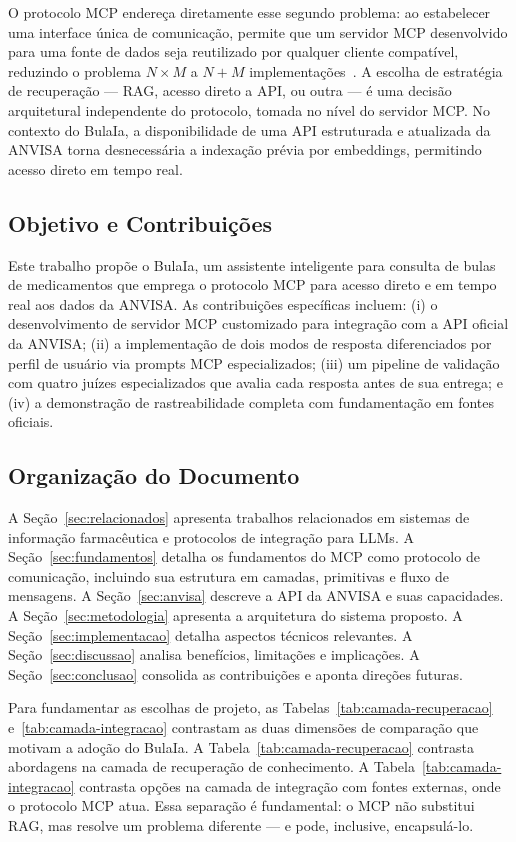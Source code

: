\documentclass[12pt]{article}
\begin{document}
O protocolo MCP endereça diretamente esse segundo problema: ao estabelecer uma interface única de comunicação, permite que um servidor MCP desenvolvido para uma fonte de dados seja reutilizado por qualquer cliente compatível, reduzindo o problema $N \times M$ a $N + M$ implementações~\cite{hou2025mcp}. A escolha de estratégia de recuperação --- RAG, acesso direto a API, ou outra --- é uma decisão arquitetural independente do protocolo, tomada no nível do servidor MCP. No contexto do BulaIa, a disponibilidade de uma API estruturada e atualizada da ANVISA torna desnecessária a indexação prévia por embeddings, permitindo acesso direto em tempo real.

\subsection{Objetivo e Contribuições}

Este trabalho propõe o BulaIa, um assistente inteligente para consulta de bulas de medicamentos que emprega o protocolo MCP para acesso direto e em tempo real aos dados da ANVISA. As contribuições específicas incluem: (i) o desenvolvimento de servidor MCP customizado para integração com a API oficial da ANVISA; (ii) a implementação de dois modos de resposta diferenciados por perfil de usuário via prompts MCP especializados; (iii) um pipeline de validação com quatro juízes especializados que avalia cada resposta antes de sua entrega; e (iv) a demonstração de rastreabilidade completa com fundamentação em fontes oficiais.

\subsection{Organização do Documento}

A Seção~\ref{sec:relacionados} apresenta trabalhos relacionados em sistemas de informação farmacêutica e protocolos de integração para LLMs. A Seção~\ref{sec:fundamentos} detalha os fundamentos do MCP como protocolo de comunicação, incluindo sua estrutura em camadas, primitivas e fluxo de mensagens. A Seção~\ref{sec:anvisa} descreve a API da ANVISA e suas capacidades. A Seção~\ref{sec:metodologia} apresenta a arquitetura do sistema proposto. A Seção~\ref{sec:implementacao} detalha aspectos técnicos relevantes. A Seção~\ref{sec:discussao} analisa benefícios, limitações e implicações. A Seção~\ref{sec:conclusao} consolida as contribuições e aponta direções futuras.

Para fundamentar as escolhas de projeto, as Tabelas~\ref{tab:camada-recuperacao} e~\ref{tab:camada-integracao} contrastam as duas dimensões de comparação que motivam a adoção do BulaIa. A Tabela~\ref{tab:camada-recuperacao} contrasta abordagens na camada de recuperação de conhecimento. A Tabela~\ref{tab:camada-integracao} contrasta opções na camada de integração com fontes externas, onde o protocolo MCP atua. Essa separação é fundamental: o MCP não substitui RAG, mas resolve um problema diferente --- e pode, inclusive, encapsulá-lo.
\end{document}
